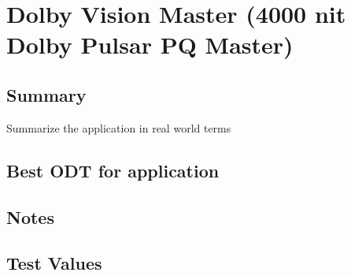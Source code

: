 \clearpage
\section{Dolby Vision Master (4000 nit Dolby Pulsar PQ Master)}
\label{sec:ot-app-doblyVision}

\subsection{Summary}
\label{subsec:summary-doblyVision}

Summarize the application in real world terms

\subsection{Best ODT for application}
\label{subsec:bestODT-doblyVision}

\subsection{Notes}
\label{subsec:notes-doblyVision}

\subsection{Test Values}
\label{subsec:testValues-dolbyVision}

